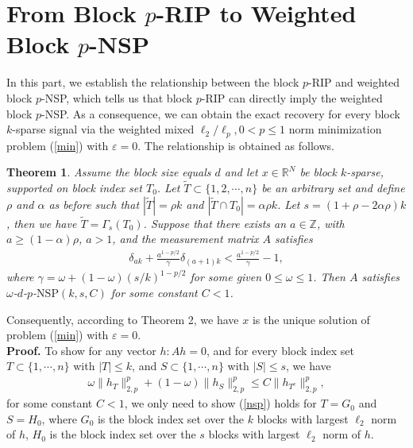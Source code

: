 \documentclass[11pt]{article}
\newtheorem{theorem}{Theorem}
\begin{document}
\section{From Block $p$-RIP to Weighted Block $p$-NSP}

In this part, we establish the relationship between the block $p$-RIP and weighted block $p$-NSP, which tells us that block $p$-RIP can directly imply the weighted block $p$-NSP. As a consequence, we can obtain the exact recovery for every block $k$-sparse signal via the weighted mixed $\ell_2/\ell_p, 0<p\leq 1$ norm minimization problem (\ref{min}) with $\varepsilon=0$. The relationship is obtained as follows.

\begin{theorem}  Assume the block size equals $d$ and let $x\in\mathbb{R}^N$ be block $k$-sparse, supported on block index set $T_0$. Let $\tilde{T}\subset\{1,2,\cdots,n\}$ be an arbitrary set and define $\rho$ and $\alpha$ as before such that $|\tilde{T}|=\rho k$ and $|\tilde{T}\cap T_0|=\alpha \rho k$. Let $s=(1+\rho-2\alpha\rho)k$, then we have $\tilde{T}=\Gamma_s(T_0)$. Suppose that there exists an $a\in\mathbb{Z}$, with $a\geq (1-\alpha)\rho$, $a>1$, and the measurement matrix $A$ satisfies \begin{align}
\delta_{ak}+\frac{a^{1-p/2}}{\gamma}\delta_{(a+1)k}<\frac{a^{1-p/2}}{\gamma}-1,
\end{align}
where $\gamma=\omega+(1-\omega)(s/k)^{1-p/2}$ for some given $0\leq \omega\leq 1$. Then $A$ satisfies $\omega$-$d$-$p$-$\mathrm{NSP}(k,s,C)$ for some constant $C<1$. 
\end{theorem}

Consequently, according to Theorem 2, we have $x$ is the unique solution of problem (\ref{min}) with $\varepsilon=0$.\\


\noindent
{\bf Proof.} To show for any vector $h: Ah=0$, and for every block index set $T\subset\{1,\cdots,n\}$ with $|T|\leq k$, and $S\subset\{1,\cdots,n\}$ with $|S|\leq s$, we have \begin{align}
\omega\lVert h_T\rVert_{2,p}^p+(1-\omega)\lVert h_S\rVert_{2,p}^p\leq C\lVert h_{T^c}\rVert_{2,p}^p, \label{nsp}
\end{align}
for some constant $C<1$, we only need to show (\ref{nsp}) holds for $T=G_0$ and $S=H_0$, where $G_0$ is the block index set over the $k$ blocks with largest $\ell_2$ norm of $h$, $H_0$ is the block index set over the $s$ blocks with largest $\ell_2$ norm of $h$.
\end{document}
